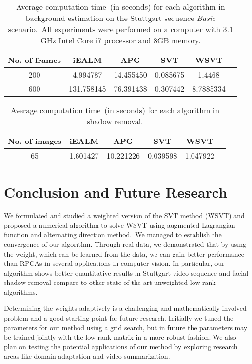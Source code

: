 \documentclass[twoside,11pt]{article}
\begin{document}
\begin{table}[H]
	\caption{Average computation time~(in seconds) for each algorithm in background estimation on the Stuttgart sequence {\it Basic} scenario.~All experiments were performed on a computer with 3.1 GHz Intel Core i7 processor and 8GB memory.} \label{table_1}
	\begin{center}
		\begin{tabular}{|c|c|c|c|c|c|}
			\hline No. of frames & iEALM & APG & SVT & WSVT \\
			\hline 200  & 4.994787 & 14.455450  & 0.085675 & 1.4468\\
			\hline 600  & 131.758145 & 76.391438  & 0.307442 & 8.7885334\\
			\hline
		\end{tabular}
	\end{center}
\end{table}
\begin{table}[H]
	\caption{Average computation time~(in seconds) for each algorithm in shadow removal.} \label{table_2}
	\begin{center}
		\begin{tabular}{|c|c|c|c|c|c|}
			\hline No. of images & iEALM & APG & SVT & WSVT \\
			\hline 65  & 1.601427 & 10.221226  & 0.039598 & 1.047922\\
			\hline
		\end{tabular}
	\end{center}
\end{table}
\section{Conclusion and Future Research}

We formulated and studied a weighted version of the SVT method (WSVT) and proposed a numerical algorithm to solve WSVT using augmented Lagrangian function and alternating direction method.~We managed to establish the convergence of our algorithm. Through real data, we demonstrated that by using the weight, which can be learned from the data, we can gain better performance than RPCAs in several applications in computer vision. In particular, our algorithm shows better quantitative results in Stuttgart video sequence and facial shadow removal compare to other state-of-the-art unweighted low-rank algorithms.

Determining the weights adaptively is a challenging and mathematically involved problem and a good starting point for future research. Initially we tuned the parameters for our method using a grid search, but in future the parameters may be trained jointly with the low-rank matrix in a more robust fashion. We also plan on testing the potential applications of our method by exploring research areas like domain adaptation and video summarization.  
\end{document}
